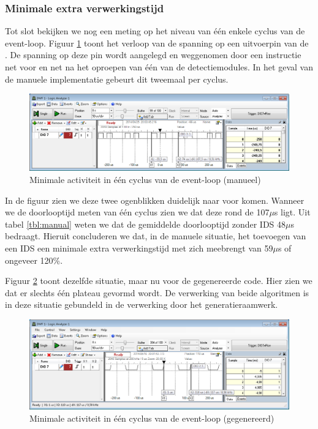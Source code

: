 \subsubsection{Minimale extra verwerkingstijd}

Tot slot bekijken we nog een meting op het niveau van \'e\'en enkele cyclus van
de event-loop. Figuur \ref{fig:logic-analyser-manual} toont het verloop van de
spanning op een uitvoerpin van de \mcu. De spanning op deze pin wordt aangelegd
en weggenomen door een instructie net voor en net na het oproepen van \'e\'en
van de detectiemodules. In het geval van de manuele implementatie gebeurt dit
tweemaal per cyclus.

\begin{figure}[ht]
  \centering
  \includegraphics[width=\linewidth]{../src/demo/idle-event-loop-both-manual.png}
  \caption{Minimale activiteit in \'e\'en cyclus van de event-loop (manueel)}
  \label{fig:logic-analyser-manual}
\end{figure}

In de figuur zien we deze twee ogenblikken duidelijk naar voor komen. Wanneer
we de doorlooptijd meten van \'e\'en cyclus zien we dat deze rond de 107$\mu$s
ligt. Uit tabel \ref{tbl:manual} weten we dat de gemiddelde doorlooptijd
zonder IDS 48$\mu$s bedraagt. Hieruit concluderen we dat, in de manuele
situatie, het toevoegen van een IDS een minimale extra verwerkingstijd met zich
meebrengt van 59$\mu$s of ongeveer 120\%.

Figuur \ref{fig:logic-analyser-generated} toont dezelfde situatie, maar nu voor
de gegenereerde code. Hier zien we dat er slechts \'e\'en plateau gevormd
wordt. De verwerking van beide algoritmen is in deze situatie gebundeld in de
verwerking door het generatieraamwerk.

\begin{figure}[ht]
  \centering
  \includegraphics[width=\linewidth]{../src/demo/idle-event-loop-both-generated.png}
  \caption{Minimale activiteit in \'e\'en cyclus van de event-loop (gegenereerd)}
  \label{fig:logic-analyser-generated}
\end{figure}

